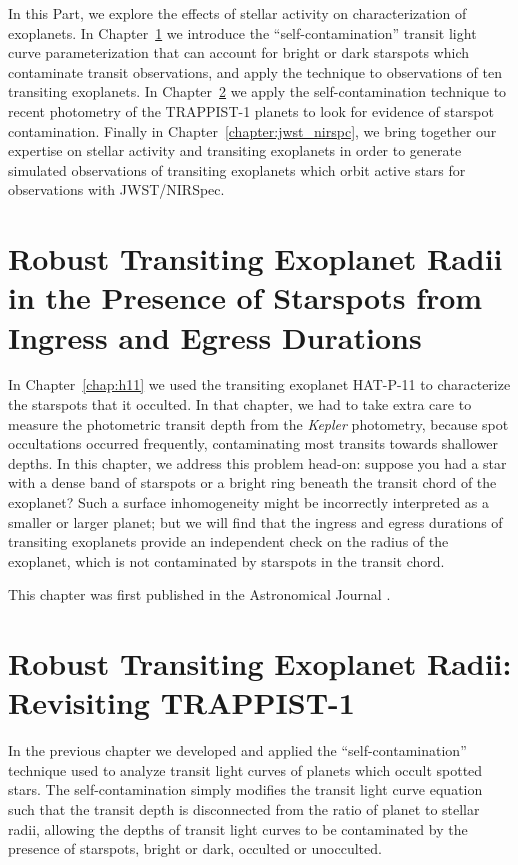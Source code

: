 \documentclass[12pt, twoside]{uwthesis}
\newcommand{\kepler}{\textsl{Kepler}\xspace}
\begin{document}
In this Part, we explore the effects of stellar activity on characterization of exoplanets. In Chapter~\ref{chapter:robin} we introduce the ``self-contamination'' transit light curve parameterization that can account for bright or dark starspots which contaminate transit observations, and apply the technique to observations of ten transiting exoplanets. In Chapter~\ref{chapter:robin_trap} we apply the self-contamination technique to recent \spitzer photometry of the TRAPPIST-1 planets to look for evidence of starspot contamination. Finally in Chapter~\ref{chapter:jwst_nirspc}, we bring together our expertise on stellar activity and transiting exoplanets in order to generate simulated observations of transiting exoplanets which orbit active stars for observations with JWST/NIRSpec.  

\chapter{Robust Transiting Exoplanet Radii in the Presence of Starspots from Ingress and Egress Durations} \label{chapter:robin}

In Chapter~\ref{chap:h11} we used the transiting exoplanet HAT-P-11 to characterize the starspots that it occulted. In that chapter, we had to take extra care to measure the photometric transit depth from the \kepler photometry, because spot occultations occurred frequently, contaminating most transits towards shallower depths. In this chapter, we address this problem head-on: suppose you had a star with a dense band of starspots or a bright ring beneath the transit chord of the exoplanet? Such a surface inhomogeneity might be incorrectly interpreted as a smaller or larger planet; but we will find that the ingress and egress durations of transiting exoplanets provide an independent check on the radius of the exoplanet, which is not contaminated by starspots in the transit chord.    

This chapter was first published in the Astronomical Journal \citep{Morris2018e}.



\chapter{Robust Transiting Exoplanet Radii: Revisiting TRAPPIST-1} \label{chapter:robin_trap}

In the previous chapter we developed and applied the ``self-contamination'' technique used to analyze transit light curves of planets which occult spotted stars. The self-contamination simply modifies the \citet{Mandel2002} transit light curve equation such that the transit depth is disconnected from the ratio of planet to stellar radii, allowing the depths of transit light curves to be contaminated by the presence of starspots, bright or dark, occulted or unocculted. 
\end{document}
